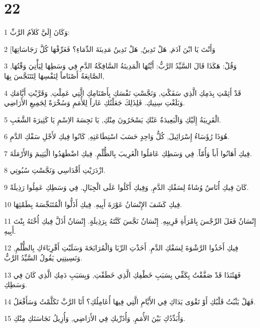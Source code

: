 \chapter{22}

\par 1 وَكَانَ إِلَيَّ كَلاَمُ الرَّبِّ:
\par 2 [وَأَنْتَ يَا ابْنَ آدَمَ, هَلْ تَدِينُ, هَلْ تَدِينُ مَدِينَةَ الدِّمَاءِ؟ فَعَرِّفْهَا كُلَّ رَجَاسَاتِهَا
\par 3 وَقُلْ: هَكَذَا قَالَ السَّيِّدُ الرَّبُّ: أَيَّتُهَا الْمَدِينَةُ السَّافِكَةُ الدَّمِ فِي وَسَطِهَا لِيَأْتِيَ وَقْتُهَا, الصَّانِعَةُ أَصْنَاماً لِنَفْسِهَا لِتَتَنَجَّسَ بِهَا,
\par 4 قَدْ أَثِمْتِ بِدَمِكِ الَّذِي سَفَكْتِ, وَنَجَّسْتِ نَفْسَكِ بِأَصْنَامِكِ الَّتِي عَمِلْتِ, وَقَرَّبْتِ أَيَّامَكِ وَبَلَغْتِ سِنِيكِ. فَلِذَلِكَ جَعَلْتُكِ عَاراً لِلأُمَمِ وَسُخْرَةً لِجَمِيعِ الأَرَاضِي.
\par 5 الْقَرِيبَةُ إِلَيْكِ وَالْبَعِيدَةُ عَنْكِ يَسْخَرُونَ مِنْكِ, يَا نَجِسَةَ الاِسْمِ يَا كَثِيرَةَ الشَّغَبِ.
\par 6 هُوَذَا رُؤَسَاءُ إِسْرَائِيلَ, كُلُّ وَاحِدٍ حَسَبَ اسْتِطَاعَتِهِ, كَانُوا فِيكِ لأَجْلِ سَفْكِ الدَّمِ.
\par 7 فِيكِ أَهَانُوا أَباً وَأُمّاً. فِي وَسَطِكِ عَامَلُوا الْغَرِيبَ بِالظُّلْمِ. فِيكِ اضْطَهَدُوا الْيَتِيمَ وَالأَرْمَلَةَ.
\par 8 ازْدَرَيْتِ أَقْدَاسِي وَنَجَّسْتِ سُبُوتِي.
\par 9 كَانَ فِيكِ أُنَاسٌ وُشَاةٌ لِسَفْكِ الدَّمِ, وَفِيكِ أَكَلُوا عَلَى الْجِبَالِ. فِي وَسَطِكِ عَمِلُوا رَذِيلَةً.
\par 10 فِيكِ كَشَفَ الإِنْسَانُ عَوْرَةَ أَبِيهِ. فِيكِ أَذَلُّوا الْمُتَنَجِّسَةَ بِطَمْثِهَا.
\par 11 إِنْسَانٌ فَعَلَ الرِّجْسَ بِامْرَأَةِ قَرِيبِهِ. إِنْسَانٌ نَجَّسَ كَنَّتَهُ بِرَذِيلَةٍ. إِنْسَانٌ أَذَلَّ فِيكِ أُخْتَهُ بِنْتَ أَبِيهِ.
\par 12 فِيكِ أَخَذُوا الرَّشْوَةَ لِسَفْكِ الدَّمِ. أَخَذْتِ الرِّبَا وَالْمُرَابَحَةَ وَسَلَبْتِ أَقْرِبَاءَكِ بِالظُّلْمِ, وَنَسِيتِنِي يَقُولُ السَّيِّدُ الرَّبُّ.
\par 13 فَهَئَنَذَا قَدْ صَفَّقْتُ بِكَفِّي بِسَبَبِ خَطْفِكِ الَّذِي خَطَفْتِ, وَبِسَبَبِ دَمِكِ الَّذِي كَانَ فِي وَسَطِكِ.
\par 14 فَهَلْ يَثْبُتُ قَلْبُكِ أَوْ تَقْوَى يَدَاكِ فِي الأَيَّامِ الَّتِي فِيهَا أُعَامِلُكِ؟ أَنَا الرَّبَّ تَكَلَّمْتُ وَسَأَفْعَلُ.
\par 15 وَأُبَدِّدُكِ بَيْنَ الأُمَمِ, وَأُذَرِّيكِ فِي الأَرَاضِي, وَأُزِيلُ نَجَاسَتَكِ مِنْكِ.
